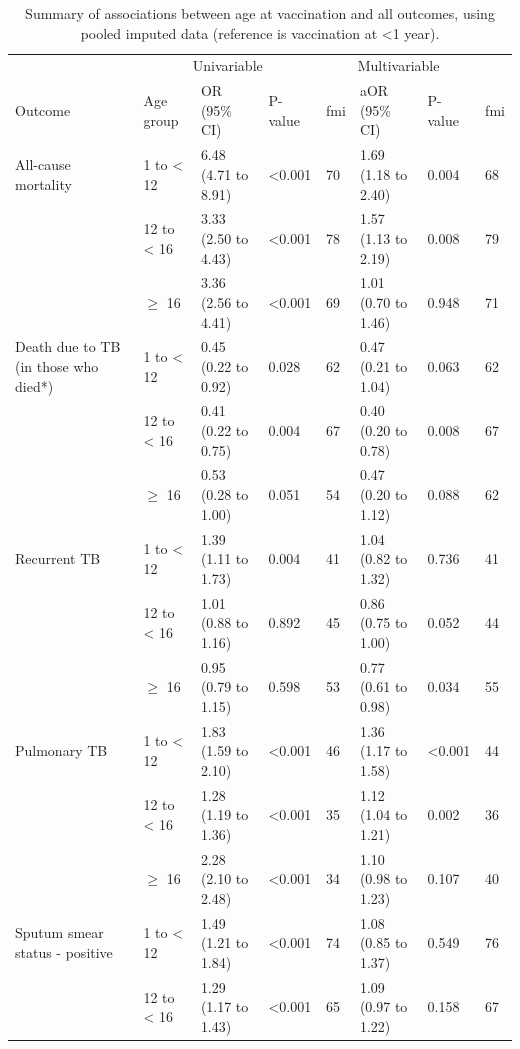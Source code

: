 \documentclass[11pt,twoside]{bristolthesis}
\begin{document}
  \begin{table}[!h]
  
  \caption{\label{tab:06-imp-ageatvac}Summary of associations between age at vaccination and all outcomes, using pooled imputed data (reference is vaccination at <1 year).}
  \centering
  \fontsize{8}{10}\selectfont
  \begin{tabular}{>{\raggedright\arraybackslash}p{3cm}lllllll}
  \toprule
  \multicolumn{2}{c}{ } & \multicolumn{3}{c}{Univariable} & \multicolumn{3}{c}{Multivariable} \\
  \cmidrule(l{3pt}r{3pt}){3-5} \cmidrule(l{3pt}r{3pt}){6-8}
  Outcome & Age group & OR (95\% CI) & P-value & fmi & aOR (95\% CI) & P-value & fmi\\
  \midrule
  All-cause mortality & 1 to < 12 & 6.48 (4.71 to 8.91) & <0.001 & 70 & 1.69 (1.18 to 2.40) & 0.004 & 68\\
   & 12 to < 16 & 3.33 (2.50 to 4.43) & <0.001 & 78 & 1.57 (1.13 to 2.19) & 0.008 & 79\\
   & $\geq$ 16 & 3.36 (2.56 to 4.41) & <0.001 & 69 & 1.01 (0.70 to 1.46) & 0.948 & 71\\
  Death due to TB (in those who died*) & 1 to < 12 & 0.45 (0.22 to 0.92) & 0.028 & 62 & 0.47 (0.21 to 1.04) & 0.063 & 62\\
   & 12 to < 16 & 0.41 (0.22 to 0.75) & 0.004 & 67 & 0.40 (0.20 to 0.78) & 0.008 & 67\\
  \addlinespace
   & $\geq$ 16 & 0.53 (0.28 to 1.00) & 0.051 & 54 & 0.47 (0.20 to 1.12) & 0.088 & 62\\
  Recurrent TB & 1 to < 12 & 1.39 (1.11 to 1.73) & 0.004 & 41 & 1.04 (0.82 to 1.32) & 0.736 & 41\\
   & 12 to < 16 & 1.01 (0.88 to 1.16) & 0.892 & 45 & 0.86 (0.75 to 1.00) & 0.052 & 44\\
   & $\geq$ 16 & 0.95 (0.79 to 1.15) & 0.598 & 53 & 0.77 (0.61 to 0.98) & 0.034 & 55\\
  Pulmonary TB & 1 to < 12 & 1.83 (1.59 to 2.10) & <0.001 & 46 & 1.36 (1.17 to 1.58) & <0.001 & 44\\
  \addlinespace
   & 12 to < 16 & 1.28 (1.19 to 1.36) & <0.001 & 35 & 1.12 (1.04 to 1.21) & 0.002 & 36\\
   & $\geq$ 16 & 2.28 (2.10 to 2.48) & <0.001 & 34 & 1.10 (0.98 to 1.23) & 0.107 & 40\\
  Sputum smear status - positive & 1 to < 12 & 1.49 (1.21 to 1.84) & <0.001 & 74 & 1.08 (0.85 to 1.37) & 0.549 & 76\\
   & 12 to < 16 & 1.29 (1.17 to 1.43) & <0.001 & 65 & 1.09 (0.97 to 1.22) & 0.158 & 67\\

\end{tabular}
\end{table}
\end{document}
